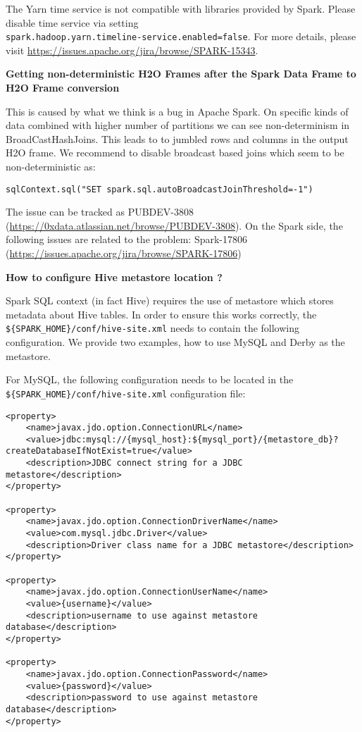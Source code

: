 The Yarn time service is not compatible with libraries provided by Spark. Please disable time service via setting \\
\texttt{spark.hadoop.yarn.timeline-service.enabled=false}.
For more details, please visit \url{https://issues.apache.org/jira/browse/SPARK-15343}.

\textbf{Getting non-deterministic H2O Frames after the Spark Data Frame to H2O Frame conversion}

This is caused by what we think is a bug in Apache Spark. On specific kinds of data combined with higher number of partitions we can see non-determinism in BroadCastHashJoins. This leads to to jumbled rows and columns in the output H2O frame. We recommend to disable broadcast based joins which seem to be non-deterministic as:

\begin{lstlisting}[style=Scala]
sqlContext.sql("SET spark.sql.autoBroadcastJoinThreshold=-1")
\end{lstlisting}

The issue can be tracked as PUBDEV-3808 (\url{https://0xdata.atlassian.net/browse/PUBDEV-3808}). On the Spark side, the following issues are related to the problem: Spark-17806 (\url{https://issues.apache.org/jira/browse/SPARK-17806})

\textbf{How to configure Hive metastore location ?}

Spark SQL context (in fact Hive) requires the use of metastore which stores metadata about Hive tables. In order to ensure this works correctly, the {\lstinline[style=Bash]|${SPARK_HOME}/conf/hive-site.xml|} needs to contain the following configuration. We provide two examples, how to use MySQL and Derby as the metastore.

For MySQL, the following configuration needs to be located in the {\lstinline[style=Bash]|${SPARK_HOME}/conf/hive-site.xml|} configuration file:

\begin{lstlisting}[style=Bash]
<property>
    <name>javax.jdo.option.ConnectionURL</name>
    <value>jdbc:mysql://{mysql_host}:${mysql_port}/{metastore_db}?createDatabaseIfNotExist=true</value>
    <description>JDBC connect string for a JDBC metastore</description>
</property>

<property>
    <name>javax.jdo.option.ConnectionDriverName</name>
    <value>com.mysql.jdbc.Driver</value>
    <description>Driver class name for a JDBC metastore</description>
</property>

<property>
    <name>javax.jdo.option.ConnectionUserName</name>
    <value>{username}</value>
    <description>username to use against metastore database</description>
</property>

<property>
    <name>javax.jdo.option.ConnectionPassword</name>
    <value>{password}</value>
    <description>password to use against metastore database</description>
</property>
\end{lstlisting}

